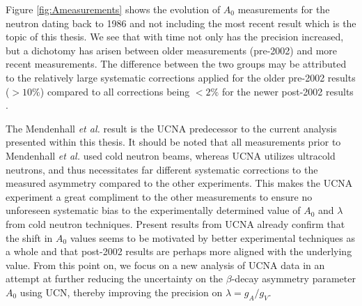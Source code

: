 Figure \ref{fig:Ameasurements} shows the evolution of $A_0$ measurements for the neutron dating back to
1986 and not including the most recent result which is the topic of this thesis. We see that
with time not only has the precision increased, but a dichotomy has arisen between older measurements
(pre-2002) and more recent measurements. The difference between the two groups may be attributed
to the relatively large systematic corrections applied for the older pre-2002 results ($>10\%$) compared to
all corrections being $<2\%$ for the newer post-2002 results \cite{brown2017}.

The Mendenhall \textit{et al.} result \cite{mendenhall2013} is the UCNA predecessor to the current analysis
presented within this thesis. It should be noted that all measurements prior to Mendenhall \textit{et al.}
used cold neutron beams, whereas UCNA utilizes ultracold neutrons, and thus necessitates far different
systematic corrections to the measured asymmetry compared to the other experiments. This makes the UCNA experiment
a great compliment to the other measurements to ensure no unforeseen systematic bias to the experimentally
determined value of $A_0$ and $\lambda$ from cold neutron techniques. Present results from UCNA already
confirm that the shift in $A_0$ values seems to
be motivated by better experimental techniques as a whole and that post-2002 results are perhaps more aligned with the
underlying value. From this point on, we focus on a new analysis of UCNA data in an
attempt at further reducing the uncertainty on the $\beta$-decay asymmetry parameter $A_0$ using UCN, thereby improving
the precision on $\lambda=g_A/g_V$.














